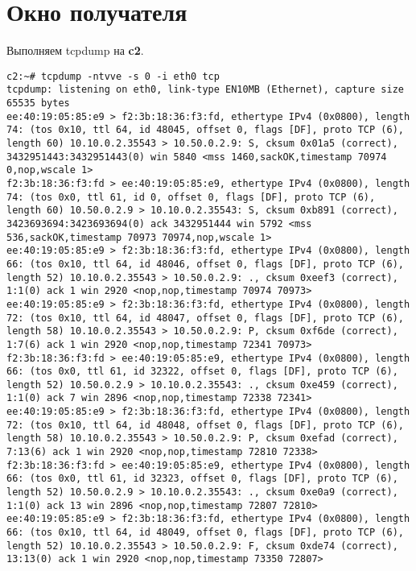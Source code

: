 \documentclass[a4paper,12pt]{article}
\begin{document}
\section{Окно получателя}

Выполняем tcpdump на \textbf{c2}.

\begin{Verbatim}
c2:~# tcpdump -ntvve -s 0 -i eth0 tcp
tcpdump: listening on eth0, link-type EN10MB (Ethernet), capture size 65535 bytes
ee:40:19:05:85:e9 > f2:3b:18:36:f3:fd, ethertype IPv4 (0x0800), length 74: (tos 0x10, ttl 64, id 48045, offset 0, flags [DF], proto TCP (6), length 60) 10.10.0.2.35543 > 10.50.0.2.9: S, cksum 0x01a5 (correct), 3432951443:3432951443(0) win 5840 <mss 1460,sackOK,timestamp 70974 0,nop,wscale 1>
f2:3b:18:36:f3:fd > ee:40:19:05:85:e9, ethertype IPv4 (0x0800), length 74: (tos 0x0, ttl 61, id 0, offset 0, flags [DF], proto TCP (6), length 60) 10.50.0.2.9 > 10.10.0.2.35543: S, cksum 0xb891 (correct), 3423693694:3423693694(0) ack 3432951444 win 5792 <mss 536,sackOK,timestamp 70973 70974,nop,wscale 1>
ee:40:19:05:85:e9 > f2:3b:18:36:f3:fd, ethertype IPv4 (0x0800), length 66: (tos 0x10, ttl 64, id 48046, offset 0, flags [DF], proto TCP (6), length 52) 10.10.0.2.35543 > 10.50.0.2.9: ., cksum 0xeef3 (correct), 1:1(0) ack 1 win 2920 <nop,nop,timestamp 70974 70973>
ee:40:19:05:85:e9 > f2:3b:18:36:f3:fd, ethertype IPv4 (0x0800), length 72: (tos 0x10, ttl 64, id 48047, offset 0, flags [DF], proto TCP (6), length 58) 10.10.0.2.35543 > 10.50.0.2.9: P, cksum 0xf6de (correct), 1:7(6) ack 1 win 2920 <nop,nop,timestamp 72341 70973>
f2:3b:18:36:f3:fd > ee:40:19:05:85:e9, ethertype IPv4 (0x0800), length 66: (tos 0x0, ttl 61, id 32322, offset 0, flags [DF], proto TCP (6), length 52) 10.50.0.2.9 > 10.10.0.2.35543: ., cksum 0xe459 (correct), 1:1(0) ack 7 win 2896 <nop,nop,timestamp 72338 72341>
ee:40:19:05:85:e9 > f2:3b:18:36:f3:fd, ethertype IPv4 (0x0800), length 72: (tos 0x10, ttl 64, id 48048, offset 0, flags [DF], proto TCP (6), length 58) 10.10.0.2.35543 > 10.50.0.2.9: P, cksum 0xefad (correct), 7:13(6) ack 1 win 2920 <nop,nop,timestamp 72810 72338>
f2:3b:18:36:f3:fd > ee:40:19:05:85:e9, ethertype IPv4 (0x0800), length 66: (tos 0x0, ttl 61, id 32323, offset 0, flags [DF], proto TCP (6), length 52) 10.50.0.2.9 > 10.10.0.2.35543: ., cksum 0xe0a9 (correct), 1:1(0) ack 13 win 2896 <nop,nop,timestamp 72807 72810>
ee:40:19:05:85:e9 > f2:3b:18:36:f3:fd, ethertype IPv4 (0x0800), length 66: (tos 0x10, ttl 64, id 48049, offset 0, flags [DF], proto TCP (6), length 52) 10.10.0.2.35543 > 10.50.0.2.9: F, cksum 0xde74 (correct), 13:13(0) ack 1 win 2920 <nop,nop,timestamp 73350 72807>

\end{Verbatim}
\end{document}

